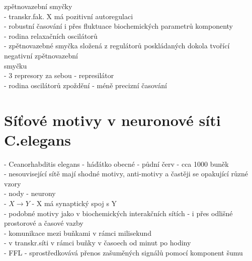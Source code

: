 \documentclass[11pt,a4paper]{report}
\begin{document}
\indent \indent zpětnovazební smyčky\\
\indent \indent - transkr.fak. X má pozitivní autoregulaci\\
\indent \indent \indent - robustní časování i přes fluktuace biochemických parametrů komponenty\\
\indent \indent \indent - rodina relaxačních oscilátorů\\
\indent - zpětnovazebné smyčka složená z regulátorů poskládaných dokola tvořící negativní zpětnovazební\\
\indent \indent smyčku\\
\indent \indent - 3 represory za sebou - represilátor\\
\indent \indent \indent - rodina oscilátorů zpoždění - méně precizní časování\\

\section{Síťové motivy v neuronové síti C.elegans}
- Ceanorhabditis elegans - háďátko obecné - půdní červ - cca 1000 buněk\\
\indent - nesouvisející sítě mají shodné motivy, anti-motivy a častěji se opakující různé vzory\\
- nody - neurony\\
- $X\rightarrow Y$ - X má synaptický spoj s Y\\
- podobné motivy jako v biochemických interakčních sítích - i přes odlišné prostorové a časové vazby\\
\indent - komunikace mezi buňkami v rámci milisekund\\
\indent - v transkr.síti v rámci buňky v časoech od minut po hodiny\\
- FFL - sprostředkovává přenos zašuměných signálů pomocí komponent šumu\\
\end{document}
